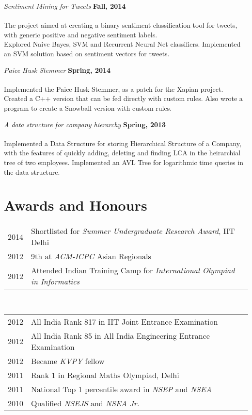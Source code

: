 \documentclass[margin,line]{res}
\begin{document}
\begin{resume}
{\em Sentiment Mining for Tweets} \hfill {\bf Fall, 2014}\\\\
The project aimed at creating a binary sentiment classification tool for tweets, with generic positive and negative sentiment labels. \\Explored Naive Bayes, SVM and Recurrent Neural Net classifiers. Implemented an SVM solution based on sentiment vectors for tweets.

{\em Paice Husk Stemmer} \hfill {\bf Spring, 2014}\\\\
Implemented the Paice Husk Stemmer, as a patch for the Xapian project. Created a C++ version that can be fed directly with custom rules. Also wrote a program to create a Snowball version with custom rules.

{\em A data structure for company hierarchy} \hfill {\bf Spring, 2013}\\\\
Implemented a Data Structure for storing Hierarchical Structure of a Company, with the features of quickly adding, deleting and finding LCA in the heirarchial tree of two employees. Implemented an AVL Tree for logarithmic time queries in the data structure.

\section{\sc Awards and Honours}

\begin{tabular}{rl}
2014 & Shortlisted for {\em Summer Undergraduate Research Award}, IIT Delhi\\
2012 & 9th at {\em ACM-ICPC} Asian Regionals\\
2012 & Attended Indian Training Camp for {\em International Olympiad in Informatics}\\
\end{tabular}\\
\begin{tabular}{rl}
2012 & All India Rank 817 in IIT Joint Entrance Examination\\
2012 & All India Rank 85 in All India Engineering Entrance Examination\\
2012 & Became {\em KVPY} fellow\\
2011 & Rank 1 in Regional Maths Olympiad, Delhi\\
2011 & National Top 1 percentile award in {\em NSEP} and {\em NSEA}\\
2010 & Qualified {\em NSEJS} and {\em NSEA Jr.}\\
\end{tabular}


\end{resume}
\end{document}
